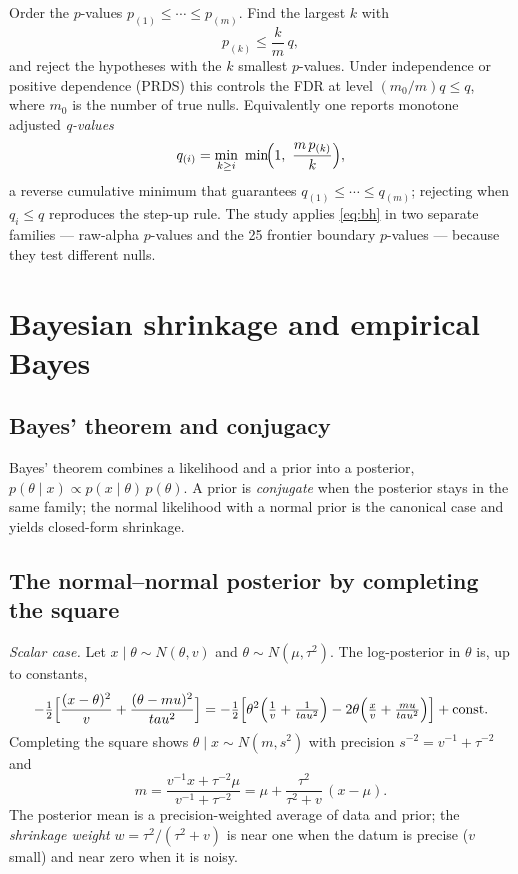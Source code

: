 Order the $p$-values $p_{(1)}\le\cdots\le p_{(m)}$. Find the largest $k$
with
\begin{equation}
p_{(k)}\le \frac{k}{m}\,q,
\end{equation}
and reject the hypotheses with the $k$ smallest $p$-values. Under
independence or positive dependence (PRDS) this controls the FDR at level
$(m_0/m)q\le q$, where $m_0$ is the number of true nulls. Equivalently one
reports monotone adjusted \emph{q-values}
\begin{equation}\label{eq:bh}
q_{(i)}=\min_{k\ge i}\ \min\!\Bigl(1,\ \frac{m\,p_{(k)}}{k}\Bigr),
\end{equation}
a reverse cumulative minimum that guarantees $q_{(1)}\le\cdots\le q_{(m)}$;
rejecting when $q_i\le q$ reproduces the step-up rule. The study applies
\eqref{eq:bh} in two separate families --- raw-alpha $p$-values and the 25
frontier boundary $p$-values --- because they test different nulls.

\section{Bayesian shrinkage and empirical Bayes}\label{prelim-eb}

\subsection{Bayes' theorem and conjugacy}

Bayes' theorem combines a likelihood and a prior into a posterior,
$p(\theta\mid x)\propto p(x\mid\theta)\,p(\theta)$. A prior is
\emph{conjugate} when the posterior stays in the same family; the normal
likelihood with a normal prior is the canonical case and yields
closed-form shrinkage.

\subsection{The normal--normal posterior by completing the square}

\emph{Scalar case.} Let $x\mid\theta\sim N(\theta,v)$ and
$\theta\sim N(\mu,\tau^2)$. The log-posterior in $\theta$ is, up to
constants,
\begin{equation}
-\tfrac12\Bigl[\frac{(x-\theta)^2}{v}+\frac{(\theta-\mu)^2}{\tau^2}\Bigr]
=-\tfrac12\Bigl[\theta^2\Bigl(\tfrac1v+\tfrac1{\tau^2}\Bigr)
-2\theta\Bigl(\tfrac{x}{v}+\tfrac{\mu}{\tau^2}\Bigr)\Bigr]+\text{const}.
\end{equation}
Completing the square shows $\theta\mid x\sim N(m,s^2)$ with precision
$s^{-2}=v^{-1}+\tau^{-2}$ and
\begin{equation}\label{eq:scalar-post}
m=\frac{v^{-1}x+\tau^{-2}\mu}{v^{-1}+\tau^{-2}}
=\mu+\frac{\tau^2}{\tau^2+v}\,(x-\mu).
\end{equation}
The posterior mean is a precision-weighted average of data and prior; the
\emph{shrinkage weight} $w=\tau^2/(\tau^2+v)$ is near one when the datum is
precise ($v$ small) and near zero when it is noisy.

